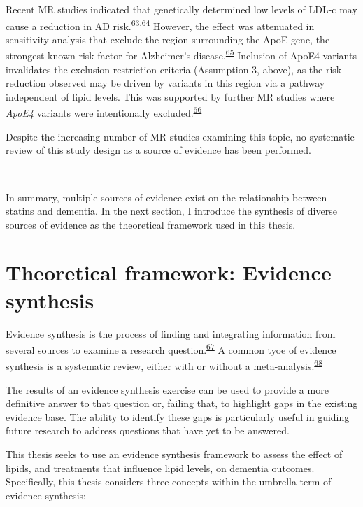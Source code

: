 \documentclass[a4paper, twoside]{templates/ociamthesis}
\begin{document}
Recent MR studies indicated that genetically determined low levels of LDL-c may cause a reduction in AD risk.\textsuperscript{\protect\hyperlink{ref-larsson2017c}{63},\protect\hyperlink{ref-ostergaard2015}{64}} However, the effect was attenuated in sensitivity analysis that exclude the region surrounding the ApoE gene, the strongest known risk factor for Alzheimer's disease.\textsuperscript{\protect\hyperlink{ref-kim2009}{65}} Inclusion of ApoE4 variants invalidates the exclusion restriction criteria (Assumption 3, above), as the risk reduction observed may be driven by variants in this region via a pathway independent of lipid levels. This was supported by further MR studies where \emph{ApoE4} variants were intentionally excluded.\textsuperscript{\protect\hyperlink{ref-benn2017}{66}}

Despite the increasing number of MR studies examining this topic, no systematic review of this study design as a source of evidence has been performed.

~

In summary, multiple sources of evidence exist on the relationship between statins and dementia. In the next section, I introduce the synthesis of diverse sources of evidence as the theoretical framework used in this thesis.

\hypertarget{theoretical-framework-evidence-synthesis}{%
\section{Theoretical framework: Evidence synthesis}\label{theoretical-framework-evidence-synthesis}}

Evidence synthesis is the process of finding and integrating information from several sources to examine a research question.\textsuperscript{\protect\hyperlink{ref-donnelly2018a}{67}} A common tyoe of evidence synthesis is a systematic review, either with or without a meta-analysis.\textsuperscript{\protect\hyperlink{ref-chandler2019chapter}{68}}

The results of an evidence synthesis exercise can be used to provide a more definitive answer to that question or, failing that, to highlight gaps in the existing evidence base. The ability to identify these gaps is particularly useful in guiding future research to address questions that have yet to be answered.

This thesis seeks to use an evidence synthesis framework to assess the effect of lipids, and treatments that influence lipid levels, on dementia outcomes.
Specifically, this thesis considers three concepts within the umbrella term of evidence synthesis:
\end{document}
